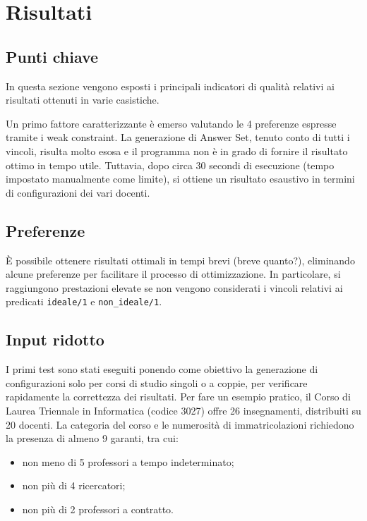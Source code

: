\section{Risultati}

\subsection{Punti chiave}
In questa sezione vengono esposti i principali indicatori di qualità 
relativi ai risultati ottenuti in varie casistiche.

Un primo fattore caratterizzante è emerso valutando le 4 preferenze espresse 
tramite i weak constraint. La generazione di Answer Set,
tenuto conto di tutti i vincoli, risulta molto esosa e il programma non è 
in grado di fornire il risultato ottimo in tempo utile.
Tuttavia, dopo circa 30 secondi di esecuzione (tempo impostato manualmente come limite),
si ottiene un risultato esaustivo in termini di configurazioni dei vari docenti.

\subsection{Preferenze}
È possibile ottenere risultati ottimali in tempi brevi (breve quanto?), eliminando alcune 
preferenze per facilitare il processo di ottimizzazione. In particolare, si raggiungono
prestazioni elevate se non vengono considerati i vincoli relativi ai predicati 
\texttt{ideale/1} e \texttt{non\_ideale/1}.

\subsection{Input ridotto}
I primi test sono stati eseguiti ponendo come obiettivo la generazione di 
configurazioni solo per corsi di studio singoli o a coppie, per verificare 
rapidamente la correttezza dei risultati.
Per fare un esempio pratico, il Corso di Laurea Triennale in Informatica (codice 3027)
offre 26 insegnamenti, distribuiti su 20 docenti.
La categoria del corso e le numerosità di immatricolazioni richiedono 
la presenza di almeno 9 garanti, tra cui:
\begin{itemize}
    \item non meno di 5 professori a tempo indeterminato;
    \item non più di 4 ricercatori;
    \item non più di 2 professori a contratto.
\end{itemize}

